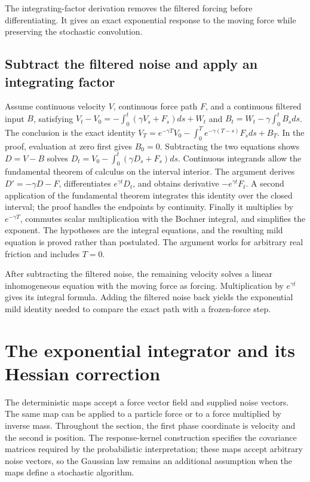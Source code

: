 \documentclass[11pt,a4paper]{report}
\begin{document}
The integrating-factor derivation removes the filtered forcing before differentiating. It gives an exact exponential response to the moving force while preserving the stochastic convolution.

\subsection{\texorpdfstring{Subtract the filtered noise and apply an integrating factor}{Subtract the filtered noise and apply an integrating factor}}
\label{report-step-KineticLangevin-MildEquation-lean-1}


Assume continuous velocity \(V\), continuous force path \(F\), and a continuous filtered input \(B\), satisfying \(V_t-V_0=-\int_0^t(\gamma V_s+F_s)ds+W_t\) and \(B_t=W_t-\gamma\int_0^tB_sds\). The conclusion is the exact identity \(V_T=e^{-\gamma T}V_0-\int_0^Te^{-\gamma(T-s)}F_sds+B_T\). In the proof, evaluation at zero first gives \(B_0=0\). Subtracting the two equations shows \(D=V-B\) solves \(D_t=V_0-\int_0^t(\gamma D_s+F_s)ds\). Continuous integrands allow the fundamental theorem of calculus on the interval interior. The argument derives \(D\!\prime=-\gamma D-F\), differentiates \(e^{\gamma t}D_t\), and obtains derivative \(-e^{\gamma t}F_t\). A second application of the fundamental theorem integrates this identity over the closed interval; the proof handles the endpoints by continuity. Finally it multiplies by \(e^{-\gamma T}\), commutes scalar multiplication with the Bochner integral, and simplifies the exponent. The hypotheses are the integral equations, and the resulting mild equation is proved rather than postulated. The argument works for arbitrary real friction and includes \(T=0\).



After subtracting the filtered noise, the remaining velocity solves a linear inhomogeneous equation with the moving force as forcing. Multiplication by \(e^{\gamma t}\) gives its integral formula. Adding the filtered noise back yields the exponential mild identity needed to compare the exact path with a frozen-force step.

\section{\texorpdfstring{The exponential integrator and its Hessian correction}{The exponential integrator and its Hessian correction}}
\label{proof-module-KineticLangevin-Integrator-lean}


The deterministic maps accept a force vector field and supplied noise vectors. The same map can be applied to a particle force or to a force multiplied by inverse mass. Throughout the section, the first phase coordinate is velocity and the second is position. The response-kernel construction specifies the covariance matrices required by the probabilistic interpretation; these maps accept arbitrary noise vectors, so the Gaussian law remains an additional assumption when the maps define a stochastic algorithm.
\end{document}
